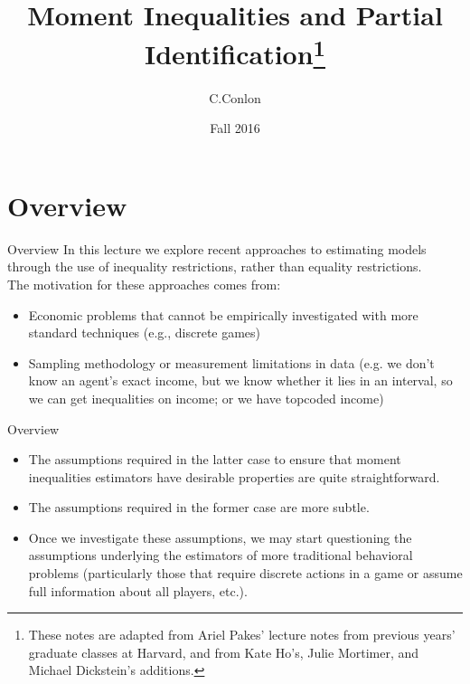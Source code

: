 \documentclass[xcolor=pdftex,dvipsnames,table,mathserif]{beamer}
\title{Moment Inequalities and Partial Identification\thanks{%
These notes are adapted from Ariel Pakes' lecture notes from previous years'
graduate classes at Harvard, and from Kate Ho's, Julie Mortimer, and Michael Dickstein's additions.}}
\author{C.Conlon}
\institute{Grad IO }
\date{Fall 2016}
\begin{document}
\frame[plain]{\titlepage}

\section[Outline]{}

\section{Overview}

\begin{frame}{Overview}
In this lecture we explore recent approaches to estimating models through the use of inequality restrictions, rather than equality restrictions.  \\
\vspace{0.2in}
The motivation for these approaches comes from:

\begin{itemize}
\item Economic problems that cannot be empirically investigated with
more standard techniques (e.g., discrete games)

\item Sampling methodology or measurement limitations in data (e.g. we don't know an agent's exact income, but we know whether it lies in an
interval, so we can get inequalities on income; or
we have topcoded income)
\end{itemize}
\end{frame}


\begin{frame}{Overview}
\begin{itemize}
\item The assumptions required in the latter case to ensure that moment
inequalities estimators have desirable properties are quite straightforward.
\vspace{0.1in}
\item The assumptions required in the former case are more subtle. 
\vspace{0.1in}
\item Once we investigate these assumptions, we may start questioning the assumptions underlying the estimators of more traditional behavioral problems (particularly those that require discrete actions in a game or assume full information about all players, etc.).
\end{itemize}
\end{frame}
\end{document}
